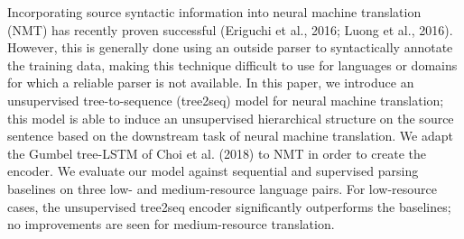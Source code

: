 Incorporating source syntactic information into neural machine translation (NMT) has recently proven successful (Eriguchi et al., 2016; Luong et al., 2016). However, this is generally done using an outside parser to syntactically annotate the training data, making this technique difficult to use for languages or domains for which a reliable parser is not available. In this paper, we introduce an unsupervised tree-to-sequence (tree2seq) model for neural machine translation; this model is able to induce an unsupervised hierarchical structure on the source sentence based on the downstream task of neural machine translation. We adapt the Gumbel tree-LSTM of Choi et al. (2018) to NMT in order to create the encoder. We evaluate our model against sequential and supervised parsing baselines on three low- and medium-resource language pairs. For low-resource cases, the unsupervised tree2seq encoder significantly outperforms the baselines; no improvements are seen for medium-resource translation.
